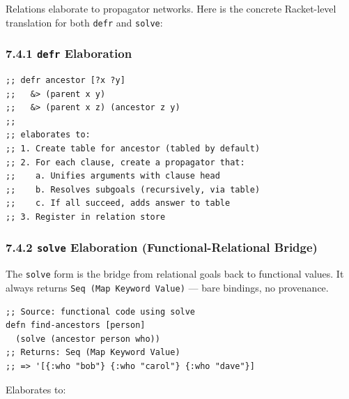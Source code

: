 \documentclass[11pt]{article}
\begin{document}
Relations elaborate to propagator networks. Here is the concrete Racket-level
translation for both \texttt{defr} and \texttt{solve}:
\subsubsection{7.4.1 \texttt{defr} Elaboration}
\label{sec:org7c081e6}

\begin{verbatim}
;; defr ancestor [?x ?y]
;;   &> (parent x y)
;;   &> (parent x z) (ancestor z y)
;;
;; elaborates to:
;; 1. Create table for ancestor (tabled by default)
;; 2. For each clause, create a propagator that:
;;    a. Unifies arguments with clause head
;;    b. Resolves subgoals (recursively, via table)
;;    c. If all succeed, adds answer to table
;; 3. Register in relation store
\end{verbatim}
\subsubsection{7.4.2 \texttt{solve} Elaboration (Functional-Relational Bridge)}
\label{sec:orge940751}

The \texttt{solve} form is the bridge from relational goals back to functional values.
It always returns \texttt{Seq (Map Keyword Value)} — bare bindings, no provenance.

\begin{verbatim}
;; Source: functional code using solve
defn find-ancestors [person]
  (solve (ancestor person who))
;; Returns: Seq (Map Keyword Value)
;; => '[{:who "bob"} {:who "carol"} {:who "dave"}]
\end{verbatim}

Elaborates to:
\end{document}
